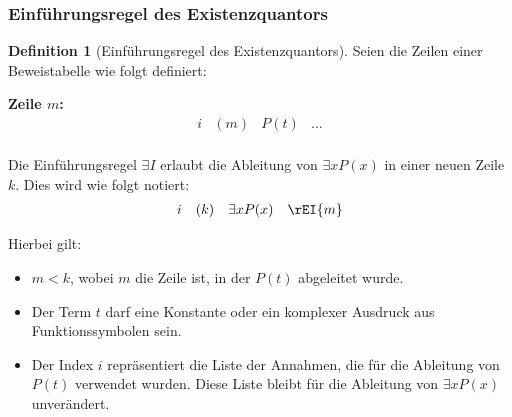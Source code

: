 \documentclass{book}
\theoremstyle{plain}
\theoremstyle{remark}
\theoremstyle{definition}
\newtheorem{definition}{Definition}[section]
\begin{document}
\subsubsection{Einführungsregel des Existenzquantors}
\label{rule:EI}
\begin{definition}[Einführungsregel des Existenzquantors]
Seien die Zeilen einer Beweistabelle wie folgt definiert:

\textbf{Zeile \(m\):}
\[
\begin{array}{llll}
    i & (m) & P(t) & \dots \\
\end{array}
\]

Die Einführungsregel \(\exists I\) erlaubt die Ableitung von \(\exists x P(x)\) in einer neuen Zeile \(k\). Dies wird wie folgt notiert:
\[
\begin{array}{llll}
    i & (k) & \exists x P(x) & \rEI{m} \\
\end{array}
\]

Hierbei gilt:
\begin{itemize}
    \item \(m < k\), wobei \(m\) die Zeile ist, in der \(P(t)\) abgeleitet wurde.
    \item Der Term \(t\) darf eine Konstante oder ein komplexer Ausdruck aus Funktionssymbolen sein.
    \item Der Index \(i\) repräsentiert die Liste der Annahmen, die für die Ableitung von \(P(t)\) verwendet wurden. Diese Liste bleibt für die Ableitung von \(\exists x P(x)\) unverändert.
\end{itemize}
\end{definition}
\end{document}
